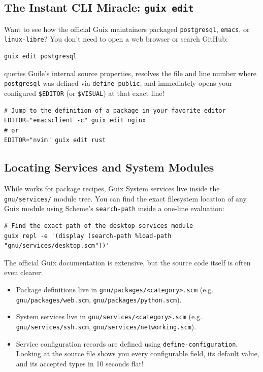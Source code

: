 \subsection{The Instant CLI Miracle: \texttt{guix edit}}

Want to see how the official Guix maintainers packaged \texttt{postgresql}, \texttt{emacs}, or \texttt{linux-libre}? You don't need to open a web browser or search GitHub:

\begin{lstlisting}[style=guixcli]
guix edit postgresql
\end{lstlisting}

 queries Guile's internal source properties, resolves the file and line number where \texttt{postgresql} was defined via \texttt{define-public}, and immediately opens your configured \texttt{\$EDITOR} (or \texttt{\$VISUAL}) at that exact line!

\begin{lstlisting}[style=guixcli]
# Jump to the definition of a package in your favorite editor
EDITOR="emacsclient -c" guix edit nginx
# or
EDITOR="nvim" guix edit rust
\end{lstlisting}

\subsection{Locating Services and System Modules}

While  works for package recipes, Guix System services live inside the \texttt{gnu/services/} module tree. You can find the exact filesystem location of any Guix module using Scheme's \texttt{search-path} inside a one-line evaluation:

\begin{lstlisting}[style=guixcli]
# Find the exact path of the desktop services module
guix repl -e '(display (search-path %load-path "gnu/services/desktop.scm"))'
\end{lstlisting}

\begin{alchemybox}
The official Guix documentation is extensive, but the source code itself is often even clearer:
\begin{itemize}
  \item Package definitions live in \texttt{gnu/packages/<category>.scm} (e.g. \texttt{gnu/packages/web.scm}, \texttt{gnu/packages/python.scm}).
  \item System services live in \texttt{gnu/services/<category>.scm} (e.g. \texttt{gnu/services/ssh.scm}, \texttt{gnu/services/networking.scm}).
  \item Service configuration records are defined using \texttt{define-configuration}. Looking at the source file shows you every configurable field, its default value, and its accepted types in 10 seconds flat!
\end{itemize}
\end{alchemybox}

